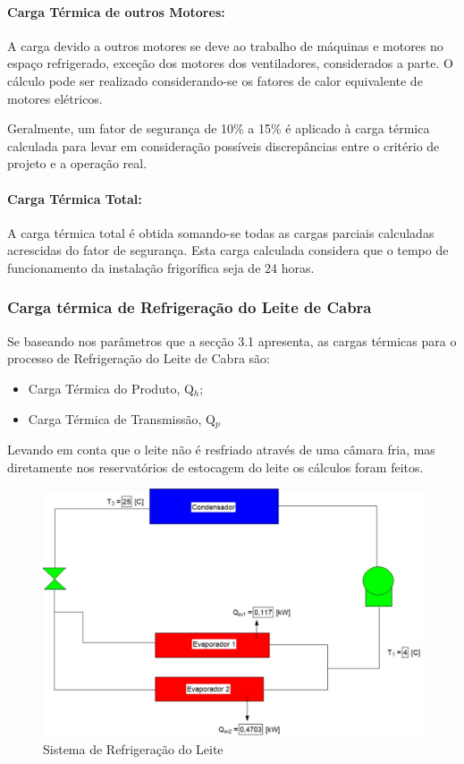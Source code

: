 \documentclass[10pt,a4paper]{article}
\begin{document}
\paragraph*{{ Carga Térmica de outros Motores:}}

A carga devido a outros motores se deve ao trabalho de máquinas e motores no espaço refrigerado, exceção dos motores dos ventiladores, considerados a parte. O cálculo pode ser realizado considerando-se os fatores de calor equivalente de motores elétricos.

Geralmente, um fator de segurança de 10\% a 15\% é aplicado à carga térmica calculada para levar em consideração possíveis discrepâncias entre o critério de projeto e a operação real.

\paragraph*{{ Carga Térmica Total:}}

A carga térmica total é obtida somando-se todas as cargas parciais calculadas acrescidas do fator de segurança. Esta carga calculada considera que o tempo de funcionamento da instalação frigorífica seja de 24 horas.

\subsubsection{{ Carga térmica de Refrigeração do Leite de Cabra}}

Se baseando nos parâmetros que a secção 3.1 apresenta, as cargas térmicas para o processo de Refrigeração do Leite de Cabra são:

\begin{itemize}
    \item Carga Térmica do Produto, Q$_h$;
    \item Carga Térmica de Transmissão, Q$_p$
\end{itemize}
Levando em conta que o leite não é resfriado através de uma câmara fria, mas diretamente nos reservatórios de estocagem do leite os cálculos foram feitos.  

\begin{figure}[H]
    \centering
    \includegraphics[scale=.5]{Figuras/Ygo_leite.jpg}
    \caption{Sistema de Refrigeração do Leite}
    \label{fig:sitleite}
\end{figure}
\end{document}
